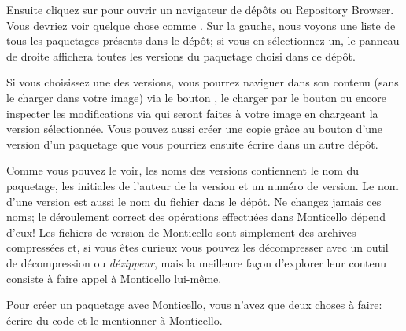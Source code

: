 \documentclass[a4paper,10pt,twoside]{book}
\begin{document}
Ensuite cliquez sur  pour ouvrir un navigateur de dépôts ou
Repository Browser. Vous devriez voir quelque chose comme
 .  
Sur la gauche, nous voyons une liste de tous les paquetages présents dans le
dépôt; si vous en sélectionnez un, le panneau de droite affichera
toutes les versions du paquetage choisi dans ce dépôt.

Si vous choisissez une des versions, vous pourrez naviguer dans son contenu (sans le charger dans votre image) via le bouton , le charger
par le bouton  ou encore inspecter les modifications
via  qui seront faites à votre image en chargeant la version
sélectionnée. Vous pouvez aussi créer une copie grâce au bouton 
d'une version d'un paquetage que vous pourriez ensuite écrire dans un
autre dépôt.

Comme vous pouvez le voir, les noms des versions contiennent le nom du paquetage, les initiales de l'auteur de la version et un numéro de version.
Le nom d'une version est aussi le nom du fichier dans le dépôt. 
Ne changez jamais ces noms; le déroulement correct des opérations
effectuées dans Monticello dépend d'eux!
Les fichiers de version de Monticello sont simplement des archives compressées
 et, si vous êtes curieux vous pouvez les décompresser avec un outil 
de décompression ou \emph{dézippeur}, mais la meilleure façon 
d'explorer leur contenu consiste à faire appel à Monticello lui-même.

Pour créer un paquetage avec Monticello, vous n'avez que deux choses à faire:
écrire du code et le mentionner à Monticello.

\end{document}
